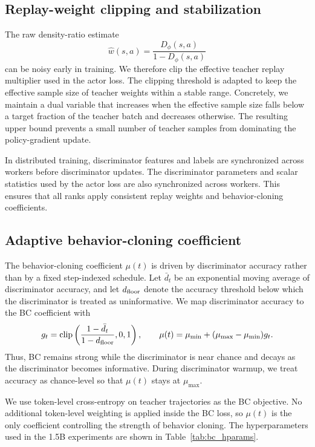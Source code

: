 \subsection{Replay-weight clipping and stabilization}
\label{app:ratio_clip}

The raw density-ratio estimate
\[
\hat w(s,a)=\frac{D_\phi(s,a)}{1-D_\phi(s,a)}
\]
can be noisy early in training.
We therefore clip the effective teacher replay multiplier used in the actor loss.
The clipping threshold is adapted to keep the effective sample size of teacher weights within a stable range.
Concretely, we maintain a dual variable that increases when the effective sample size falls below a target fraction of the teacher batch and decreases otherwise.
The resulting upper bound prevents a small number of teacher samples from dominating the policy-gradient update.

In distributed training, discriminator features and labels are synchronized across workers before discriminator updates.
The discriminator parameters and scalar statistics used by the actor loss are also synchronized across workers.
This ensures that all ranks apply consistent replay weights and behavior-cloning coefficients.

\subsection{Adaptive behavior-cloning coefficient}
\label{app:bc_schedule}

The behavior-cloning coefficient $\mu(t)$ is driven by discriminator accuracy rather than by a fixed step-indexed schedule.
Let $\bar d_t$ be an exponential moving average of discriminator accuracy, and let $d_{\rm floor}$ denote the accuracy threshold below which the discriminator is treated as uninformative.
We map discriminator accuracy to the BC coefficient with
\begin{equation}
g_t
=
\mathrm{clip}
\left(
\frac{1-\bar d_t}{1-d_{\rm floor}},
0,
1
\right),
\qquad
\mu(t)
=
\mu_{\min}
+
(\mu_{\max}-\mu_{\min})g_t .
\label{eq:appendix_bc_schedule}
\end{equation}
Thus, BC remains strong while the discriminator is near chance and decays as the discriminator becomes informative.
During discriminator warmup, we treat accuracy as chance-level so that $\mu(t)$ stays at $\mu_{\max}$.

We use token-level cross-entropy on teacher trajectories as the BC objective.
No additional token-level weighting is applied inside the BC loss, so $\mu(t)$ is the only coefficient controlling the strength of behavior cloning.
The hyperparameters used in the 1.5B experiments are shown in Table~\ref{tab:bc_hparams}.

